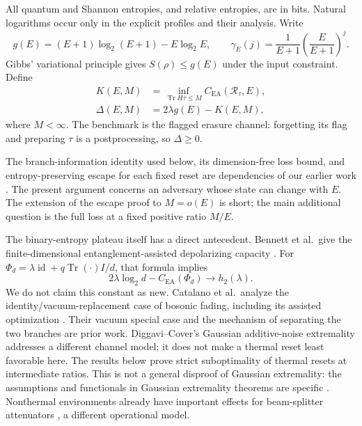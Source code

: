 \documentclass[11pt]{article}
\DeclareMathOperator{\Tr}{Tr}
\newcommand{\R}{\mathcal R}
\newcommand{\CE}{C_{\mathrm{EA}}}
\newcommand{\gE}{\gamma_E}
\newcommand{\hbin}{h_2}
\begin{document}
All quantum and Shannon entropies, and relative entropies, are in bits. Natural logarithms occur only in the explicit profiles and their analysis. Write
\[
 g(E)=(E+1)\log_2(E+1)-E\log_2 E,
 \qquad \gE(j)=\frac1{E+1}\left(\frac E{E+1}\right)^j.
\]
Gibbs' variational principle gives $S(\rho)\le g(E)$ under the input constraint. Define
\begin{align}
 K(E,M)&=\inf_{\Tr H\tau\le M}\CE(\R_\tau,E),\label{eq:k}\\
 \Delta(E,M)&=2\lambda g(E)-K(E,M),\label{eq:delta}
\end{align}
where $M<\infty$. The benchmark is the flagged erasure channel: forgetting its flag and preparing $\tau$ is a postprocessing, so $\Delta\ge0$.

The branch-information identity used below, its dimension-free loss bound, and entropy-preserving escape for each fixed reset are dependencies of our earlier work \cite{prior}. The present argument concerns an adversary whose state can change with $E$. The extension of the escape proof to $M=o(E)$ is short; the main additional question is the full loss at a fixed positive ratio $M/E$.

The binary-entropy plateau itself has a direct antecedent. Bennett et al.\ give the finite-dimensional entanglement-assisted depolarizing capacity \cite[Eq.~(3)]{bennett}. For $\Phi_d=\lambda\operatorname{id}+q\Tr(\cdot)I/d$, that formula implies
\[
 2\lambda\log_2d-\CE(\Phi_d)\longrightarrow\hbin(\lambda).
\]
We do not claim this constant as new. Catalano et al.\ analyze the identity/vacuum-replacement case of bosonic fading, including its assisted optimization \cite[Section~IV and Appendix~C]{catalano}. Their vacuum special case and the mechanism of separating the two branches are prior work. Diggavi--Cover's Gaussian additive-noise extremality \cite{diggavi} addresses a different channel model; it does not make a thermal reset least favorable here. The results below prove strict suboptimality of thermal resets at intermediate ratios. This is not a general disproof of Gaussian extremality: the assumptions and functionals in Gaussian extremality theorems are specific \cite{wolf}. Nonthermal environments already have important effects for beam-splitter attenuators \cite{lami}, a different operational model.
\end{document}
